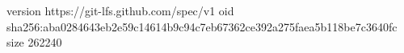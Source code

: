 version https://git-lfs.github.com/spec/v1
oid sha256:aba0284643eb2e59c14614b9c94c7eb67362ce392a275faea5b118be7c3640fc
size 262240
